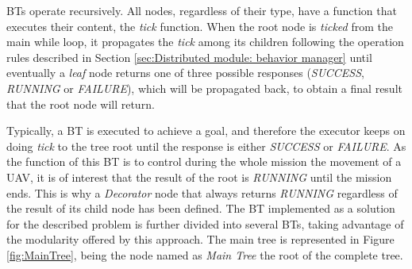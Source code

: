 \glspl{BT} operate recursively. All nodes, regardless of their type, have a function that executes their content, the \emph{tick} function. When the root node is \emph{ticked} from the main while loop, it propagates the \emph{tick} among its children following the operation rules described in Section \ref{sec:Distributed module: behavior manager} until eventually a \emph{leaf} node returns one of three possible responses (\emph{SUCCESS}, \emph{RUNNING} or \emph{FAILURE}), which will be propagated back, to obtain a final result that the root node will return. 

Typically, a \gls{BT} is executed to achieve a goal, and therefore the executor keeps on doing \emph{tick} to the tree root until the response is either \emph{SUCCESS} or \emph{FAILURE}. As the function of this \gls{BT} is to control during the whole mission the movement of a \gls{UAV}, it is of interest that the result of the root is \emph{RUNNING} until the mission ends. This is why a \emph{Decorator} node that always returns \emph{RUNNING} regardless of the result of its child node has been defined. The \gls{BT} implemented as a solution for the described problem is further divided into several \glspl{BT}, taking advantage of the modularity offered by this approach. The main tree is represented in Figure \ref{fig:MainTree}, being the node named as \emph{Main Tree} the root of the complete tree.


